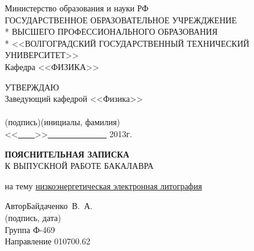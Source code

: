 \begin{titlepage}
\begin{center}
Министерство образования и науки РФ \\
\vspace{.5cm}
ГОСУДАРСТВЕННОЕ ОБРАЗОВАТЕЛЬНОЕ УЧРЕЖДЖЕНИЕ\\*
ВЫСШЕГО ПРОФЕССИОНАЛЬНОГО ОБРАЗОВАНИЯ\\*
<<ВОЛГОГРАДСКИЙ ГОСУДАРСТВЕННЫЙ ТЕХНИЧЕСКИЙ УНИВЕРСИТЕТ>>\\
\vspace{.5cm}
Кафедра <<ФИЗИКА>>
\vspace{.5cm}
\end{center}
\begin{flushright}
УТВЕРЖДАЮ\\
Заведующий кафедрой <<Физика>>\\
\vspace{.3cm}
\underline{\hspace{2cm}}\hspace{1cm}\underline{\hspace{4cm}}\\
\vspace{-.2cm}\footnotesize(подпись)\hspace{1.8cm}(инициалы, фамилия)\hspace*{.2cm}\ \normalsize\\
\vspace{.3cm}
<<\underline{\ \ \ \ }>>\underline{\ \ \ \ \ \ \ \ \ \ \ \ \ \ } 2013г.
\end{flushright}
\begin{center}
\LARGE \textbf{ПОЯСНИТЕЛЬНАЯ ЗАПИСКА} \\
\large К ВЫПУСКНОЙ РАБОТЕ БАКАЛАВРА
\end{center}
\begin{center}
на тему \underline{низкоэнергетическая электронная литография}
\end{center}
\begin{flushleft}
Автор\hspace{.7cm}Байдаченко~В.~А.\hfill\underline{\hspace{5cm}}\\
\vspace{-.2cm}\hspace{14cm}\footnotesize(подпись, дата)\normalsize\\
\vspace{-.5cm}
Группа Ф-469\\
Направление 010700.62\\

\end{flushleft}
\end{titlepage}
